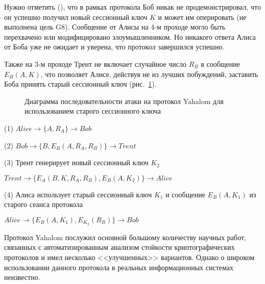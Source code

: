 Нужно отметить (\cite{Zhou:Yu:Pan:Wang:2016}), что в рамках протокола Боб никак не продемонстрировал, что он успешно получил новый сессионный ключ $K$ и может им оперировать (не выполнена цель G8). Сообщение от Алисы на 4-м проходе могло быть перехвачено или модифицировано злоумышленником. Но никакого ответа Алиса от Боба уже не ожидает и уверена, что протокол завершился успешно.

Также на 3-м проходе Трент не включает случайное число $R_B$ в сообщение $E_B(A, K)$, что позволяет Алисе, действуя не из лучших побуждений, заставить Боба принять старый сессионный ключ (рис.~\ref{fig:key_distribution-yahalom-attack}).

\begin{figure}[thb]
	\centering
	\begin{sequencediagram}

	\end{sequencediagram}
	\caption{Диаграмма последовательности атаки на протокол Yahalom для использованием старого сессионного ключа\label{fig:key_distribution-yahalom-attack}}
\end{figure}

\begin{protocol}
	\item[(1)] $Alice \to \{ A, R_A \} \to Bob$
	\item[(2)] $Bob \to \{ B, E_B( A, R_A, R_B ) \} \to Trent$
	\item[(3)] Трент генерирует новый сессионный ключ $K_2$
	\item[{}] $Trent \to \{ E_A( B, K, R_A, R_B ), E_B(A, K_2) \} \to Alice$
	\item[(4)] Алиса использует старый сессионный ключ $K_1$ и сообщение $E_B( A, K_1 )$ из старого сеанса протокола
	\item[{}] $Alice \to \{ E_B( A, K_1 ), E_{K_2}( R_B ) \} \to Bob$
\end{protocol}

Протокол Yahalom послужил основной большому количеству научных работ, связанных с автоматизированным анализом стойкости криптографических протоколов и имел несколько <<улучшенных>> вариантов. Однако о широком использовании данного протокола в реальных информационных системах неизвестно.

